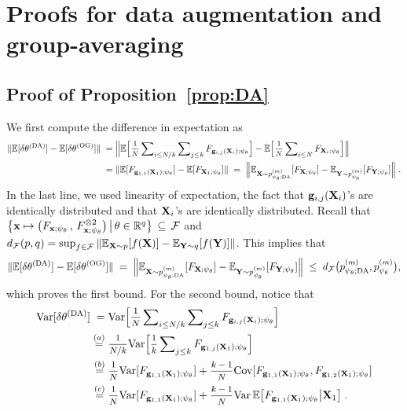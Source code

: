 \section{Proofs for data augmentation and group-averaging}  \label{appendix:proof:DA:GA}

\subsection{Proof of Proposition~\ref{prop:DA}}
We first compute the difference in expectation as
\begin{align*}
    \| \mean[ \delta \theta^{(\rm DA)}] - \mean[\delta \theta^{(\rm OG)}] \|
    \;=&\;
    \Big\| 
        \mean\Big[ \mfrac{1}{N} \msum_{i \leq N/k} \msum_{j \leq k}
    F_{\bg_{i,j}(\bX_i); \psi_\theta} \Big] 
        - 
        \mean\Big[ \mfrac{1}{N} \msum_{i \leq N} F_{\bX_i; \psi_\theta} 
        \Big] 
    \Big\|
    \\
    \;=&\;
    \| \mean[  F_{\bg_{1,1}(\bX_1); \psi_\theta} ] - \mean[  F_{\bX_1; \psi_\theta} ] \|
    \;=\; 
    \Big\| \mean_{\bX \sim p^{(m)}_{\psi_\theta; {\rm DA}}}[  F_{\bX; \psi_\theta} ] - \mean_{\bY \sim p^{(m)}_{\psi_\theta}}[  F_{\bY; \psi_\theta} ] \Big\|
    \;.
\end{align*}
In the last line, we used linearity of expectation, the fact that $\mathbf{g}_{i,j}(\mathbf{X}_i)$'s are identically distributed and that $\mathbf{X}_i$'s are identically distributed. Recall that $ \big\{ 
    \mathbf{x} \mapsto 
    \big( 
        F_{\mathbf{x};\psi_\theta}
        \,,\,
        F_{\mathbf{x};\psi_\theta}^{\otimes 2}
    \big)
    \,\big|\, 
    \theta \in \mathbb{R}^q
    \big\} 
    \,\subseteq\, \mathcal{F}$
and $d_{\mathcal{F}}(p,q) = \sup_{f \in \mathcal{F}} \| \mathbb{E}_{\mathbf{X} \sim p}[f(\mathbf{X})] -  \mathbb{E}_{\mathbf{Y} \sim q}[f(\mathbf{Y})] \|$. This implies that
\begin{align*}
    \| \mathbb{E}[ \delta \theta^{(\rm DA)}] - \mathbb{E}[ \delta \theta^{(\rm OG)}] \|
    \;=\;
    \Big\| \mathbb{E}_{\mathbf{X} \sim p^{(m)}_{\psi_\theta; {\rm DA}}}[  F_{\mathbf{X}; \psi_\theta} ] - \mathbb{E}_{\mathbf{Y} \sim p^{(m)}_{\psi_\theta}}[  F_{\mathbf{Y}; \psi_\theta} ] \Big\|
    \;\leq\; 
    d_{\mathcal{F}} \big(  p^{(m)}_{\psi_\theta; {\rm DA}},  p^{(m)}_{\psi_\theta} \big),
\end{align*}
which proves the first bound. For the second bound, notice that 
\begin{align*}
    \Var[ \delta \theta^{(\rm DA)} ]
    \;=&\; 
    \Var\Big[ 
        \mfrac{1}{N} \msum_{i \leq N/k} \msum_{j \leq k}
        F_{\bg_{i,j}(\bX_i); \psi_\theta}
    \Big]
    \\
    \;\overset{(a)}{=}&\;
    \mfrac{1}{N/k}
    \Var\Big[ 
        \mfrac{1}{k} \msum_{j \leq k}
        F_{\bg_{1,j}(\bX_1); \psi_\theta}
    \Big]
    \\
    \;\overset{(b)}{=}&\;
    \mfrac{1}{N}
    \Var[ F_{\bg_{1,1}(\bX_1); \psi_\theta}]
    +
    \mfrac{k-1}{N} 
    \Cov[  F_{\bg_{1,1}(\bX_1); \psi_\theta},  F_{\bg_{1,2}(\bX_1); \psi_\theta} ]
    \\
    \;\overset{(c)}{=}&\;
    \mfrac{1}{N}
    \Var[ F_{\bg_{1,1}(\bX_1); \psi_\theta}]
    +
    \mfrac{k-1}{N} 
    \Var \, \mean\big[ F_{\bg_{1,1}(\bX_1); \psi_\theta} \big| \bX_1 \big]
    \;.
\end{align*}

